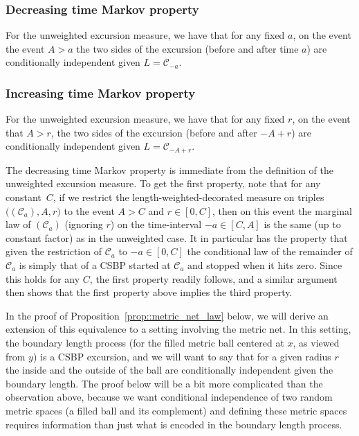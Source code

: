 \documentclass[10pt]{amsart}
\let\mathcal\mathscr
\theoremstyle{plain}
\numberwithin{theorem}{section}
\theoremstyle{definition}
\newcommand{\CC}{{\mathcal C}}
\begin{document}
\subsubsection*{Decreasing time Markov property} For the unweighted excursion measure, we have that for any fixed $a$, on the event the event $A>a$ the two sides of the excursion (before and after time $a$) are conditionally independent given $L = \CC_{-a}$.

\subsubsection*{Increasing time Markov property} For the unweighted excursion measure, we have that for any fixed $r$, on the event that $A>r$, the two sides of the excursion (before and after $-A+r$) are conditionally independent given $L = \CC_{-A+r}$.

\smallskip
The decreasing time Markov property is immediate from the definition of the unweighted excursion measure. To get the first property, note that for any constant~$C$, if we restrict the length-weighted-decorated measure on triples $\bigl((\CC_a), A, r\bigr)$ to the event $A>C$ and $r \in [0,C]$, then on this event the marginal law of $(\CC_a)$ (ignoring $r$) on the time-interval $-a \in [C,A]$ is the same (up to constant factor) as in the unweighted case. It in particular has the property that given the restriction of $\CC_a$ to $-a \in [0,C]$ the conditional law of the remainder of $\CC_a$ is simply that of a CSBP started at $\CC_a$ and stopped when it hits zero. Since this holds for any $C$, the first property readily follows, and a similar argument then shows that the first property above implies the third property.

In the proof of Proposition~\ref{prop::metric_net_law} below, we will derive an extension of this equivalence to a setting involving the metric net. In this setting, the boundary length process (for the filled metric ball centered at $x$, as viewed from $y$) is a CSBP excursion, and we will want to say that for a given radius $r$ the inside and the outside of the ball are conditionally independent given the boundary length. The proof below will be a bit more complicated than the observation above, because we want conditional independence of two random metric spaces (a filled ball and its complement) and defining these metric spaces requires information than just what is encoded in the boundary length process.
\end{document}
